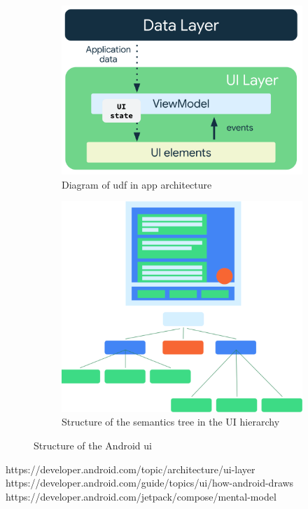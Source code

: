 \begin{figure}
    \centering
    \begin{subfigure}[b]{0.5\textwidth}
        \centering
        \includegraphics[width=\textwidth]{graphics/android_udf}
        \caption{Diagram of \gls{udf} in app architecture \cite{android_ui_layer}}
        \label{fig:android_udf}
    \end{subfigure}
    \hfill
    \begin{subfigure}[b]{0.4\textwidth}
        \centering
        \includegraphics[width=\textwidth]{graphics/android_semantics-ui-tree}
        \caption{Structure of the semantics tree in the UI hierarchy \cite{android_semantics_compose}}
        \label{fig:android_semantics_ui_tree}
    \end{subfigure}
    \caption{Structure of the Android \gls{ui}}
    \label{fig:android_tree}
\end{figure}
https://developer.android.com/topic/architecture/ui-layer \cite{android_ui_layer}
https://developer.android.com/guide/topics/ui/how-android-draws \cite{android_draw_views}
https://developer.android.com/jetpack/compose/mental-model \cite{android_jetpack_compose}

